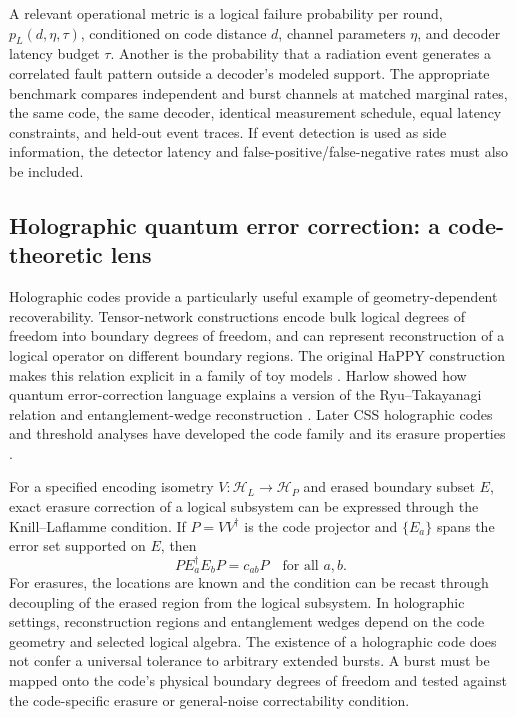 \documentclass[11pt,a4paper,oneside]{article}
\begin{document}
A relevant operational metric is a logical failure probability per round, \(p_L(d,\eta,\tau)\), conditioned on code distance \(d\), channel parameters \(\eta\), and decoder latency budget \(\tau\). Another is the probability that a radiation event generates a correlated fault pattern outside a decoder's modeled support. The appropriate benchmark compares independent and burst channels at matched marginal rates, the same code, the same decoder, identical measurement schedule, equal latency constraints, and held-out event traces. If event detection is used as side information, the detector latency and false-positive/false-negative rates must also be included.

\subsection{Holographic quantum error correction: a code-theoretic lens}
Holographic codes provide a particularly useful example of geometry-dependent recoverability. Tensor-network constructions encode bulk logical degrees of freedom into boundary degrees of freedom, and can represent reconstruction of a logical operator on different boundary regions. The original HaPPY construction makes this relation explicit in a family of toy models \citep{Pastawski2015}. Harlow showed how quantum error-correction language explains a version of the Ryu--Takayanagi relation and entanglement-wedge reconstruction \citep{Harlow2017}. Later CSS holographic codes and threshold analyses have developed the code family and its erasure properties \citep{Harris2018,Bao2022}.

For a specified encoding isometry \(V:\mathcal{H}_L\rightarrow\mathcal{H}_P\) and erased boundary subset \(E\), exact erasure correction of a logical subsystem can be expressed through the Knill--Laflamme condition. If \(P=VV^\dagger\) is the code projector and \(\{E_a\}\) spans the error set supported on \(E\), then
\begin{equation}\label{eq:KL}
P E_a^\dagger E_b P = c_{ab}P \quad \text{for all }a,b.
\end{equation}
For erasures, the locations are known and the condition can be recast through decoupling of the erased region from the logical subsystem. In holographic settings, reconstruction regions and entanglement wedges depend on the code geometry and selected logical algebra. The existence of a holographic code does not confer a universal tolerance to arbitrary extended bursts. A burst must be mapped onto the code's physical boundary degrees of freedom and tested against the code-specific erasure or general-noise correctability condition.
\end{document}
